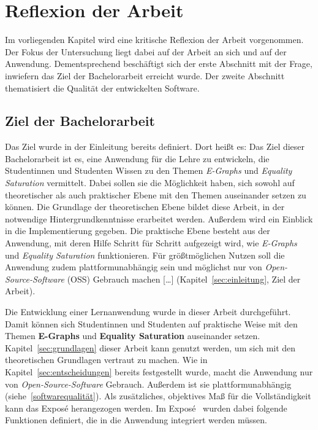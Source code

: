 \section{Reflexion der Arbeit}\label{sec:reflexion}

Im vorliegenden Kapitel wird eine kritische Reflexion der Arbeit vorgenommen. 
Der Fokus der Untersuchung liegt dabei auf der Arbeit an sich und auf der Anwendung.
Dementsprechend beschäftigt sich der erste Abschnitt mit der Frage, inwiefern das Ziel der Bachelorarbeit erreicht wurde.
Der zweite Abschnitt thematisiert die Qualität der entwickelten Software.

\subsection{Ziel der Bachelorarbeit}\label{sub:ziel}

Das Ziel wurde in der Einleitung bereits definiert. Dort heißt es: 
\glqq Das Ziel dieser Bachelorarbeit ist es, eine Anwendung für die Lehre zu entwickeln, die Studentinnen und Studenten Wissen zu den Themen \textit{E-Graphs} und \textit{Equality Saturation}
vermittelt. Dabei sollen sie die Möglichkeit haben, sich sowohl auf theoretischer als auch praktischer Ebene mit den Themen auseinander setzen zu können.
Die Grundlage der theoretischen Ebene bildet diese Arbeit, in der notwendige Hintergrundkenntnisse erarbeitet werden. Außerdem wird ein Einblick in die Implementierung gegeben. 
Die praktische Ebene besteht aus der Anwendung, mit deren Hilfe Schritt für Schritt aufgezeigt wird, wie \textit{E-Graphs} und \textit{Equality Saturation} funktionieren.
Für grö{\ss}tmöglichen Nutzen soll die Anwendung zudem plattformunabhängig sein und möglichst nur von \textit{Open-Source-Software} (OSS) Gebrauch machen [\ldots]\grqq 
(Kapitel~\ref{sec:einleitung}, Ziel der Arbeit).

Die Entwicklung einer Lernanwendung wurde in dieser Arbeit durchgeführt. Damit können sich Studentinnen und Studenten auf praktische Weise mit den Themen 
\textbf{E-Graphs} und \textbf{Equality Saturation} auseinander setzen. Kapitel~\ref{sec:grundlagen} dieser Arbeit kann genutzt werden, um sich mit den
theoretischen Grundlagen vertraut zu machen. 
Wie in Kapitel~\ref{sec:entscheidungen} bereits festgestellt wurde, macht die Anwendung nur von \textit{Open-Source-Software} Gebrauch. Außerdem ist
sie plattformunabhängig (siehe~\ref{softwarequalität}).
Als zusätzliches, objektives Maß für die Vollständigkeit kann das Exposé herangezogen werden.
Im Exposé~\cite{expose} wurden dabei folgende Funktionen definiert, die in die Anwendung integriert werden müssen.

